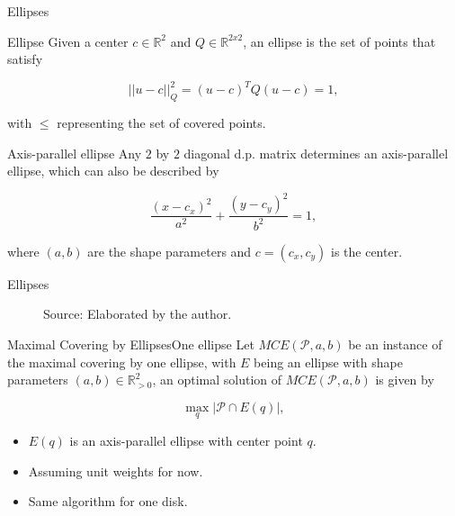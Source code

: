 \documentclass{beamer}
\newcommand{\R}{\mathbb{R}}
\newcommand{\Pp}{\mathscr{P}}
\newcommand{\source}[1]{\caption*{Source: {#1}} }
\begin{document}
\begin{frame}{Ellipses}
	
	\begin{block}{Ellipse}
		Given a center $c \in \R^2$ and $Q \in \R^ {2x2}$, an ellipse is the set of points that satisfy
		
		\begin{equation*}
		||u-c||_Q^2 = (u-c)^TQ(u-c) = 1,
		\end{equation*}
		
		with $\le$ representing the set of covered points.
	\end{block}
	
	\begin{block}{Axis-parallel ellipse}
		Any $2$ by $2$ diagonal d.p. matrix determines an axis-parallel ellipse, which can also be described by
		
		\begin{equation*}
		\frac{(x-c_x)^2}{a^2} + \frac{(y-c_y)^2}{b^2} = 1,
		\end{equation*}
		
		where $(a,b)$ are the shape parameters and $c=(c_x,c_y)$ is the center.
	\end{block}
	
\end{frame}

\begin{frame}{Ellipses}
	\begin{figure}[H]
		\centering
		
		\caption{The ellipse seen as just a linear transformation of a circle.}
		
		\source{Elaborated by the author.}
		\label{fig:3ellipses_intersect}
		
	\end{figure}
\end{frame}



\begin{frame}{Maximal Covering by Ellipses}{One ellipse}
	Let $MCE(\Pp, a, b)$ be an instance of the maximal covering by one ellipse, with $E$ being an ellipse with shape parameters $(a,b) \in \R_{>0}^2$, an optimal solution of $MCE(\Pp, a, b)$ is given by
	
	\begin{equation*}
	\max_q |\Pp \cap E(q)|,
	\end{equation*}

	\begin{itemize}
		\item $E(q)$ is an axis-parallel ellipse with center point $q$.
		\item Assuming unit weights for now.
		\item Same algorithm for one disk.
	\end{itemize}

\end{frame}
\end{document}
